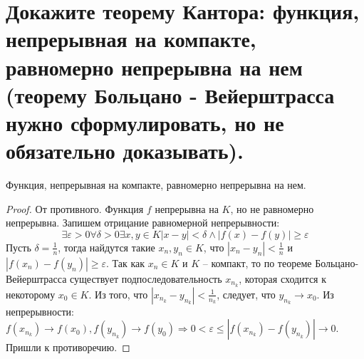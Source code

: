 \section{Докажите теорему Кантора: функция, непрерывная на компакте, равномерно непрерывна на нем (теорему Больцано - Вейерштрасса нужно сформулировать, но не обязательно доказывать).}

\begin{theorem}
    Функция, непрерывная на компакте, равномерно непрерывна на нем.
    \begin{proof}
        От противного. Функция $f$ непрерывна на $K$, но не равномерно непрерывна. Запишем отрицание равномерной непрерывности:
        \[
            \exists \varepsilon > 0
            \forall \delta > 0
            \exists x, y \in K
            |x - y| < \delta \wedge |f(x) - f(y)| \geqslant \varepsilon
        \]
        Пусть $\delta = \frac{1}{n}$, тогда найдутся такие $x_n, y_n \in K$, что $|x_n - y_n| < \frac{1}{n}$ и $|f(x_n) - f(y_n)| \geqslant \varepsilon$.
        \newline
        Так как $x_n \in K$ и $K$ -- компакт, то по теореме Больцано-Вейерштрасса существует подпоследовательность $x_{n_k}$, которая сходится к некоторому $x_0 \in K$.
        Из того, что $|x_{n_k} - y_{n_k}| < \frac{1}{n_k}$, следует, что $y_{n_k} \to x_0$.
        Из непрерывности: $f(x_{n_k}) \to f(x_0), f(y_{n_k}) \to f(y_0) \Rightarrow 0 < \varepsilon \leqslant |f(x_{n_k}) - f(y_{n_k})| \to 0$. Пришли к противоречию.
    \end{proof}
\end{theorem}